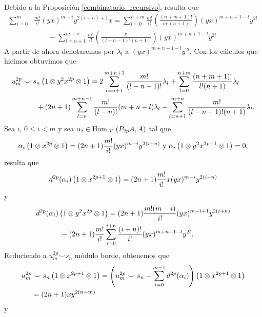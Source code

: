 \documentclass[fleqn,../tesis.tex]{subfiles}
\begin{document}
Debido a la Proposición \ref{combinatorio_recursivo}, resulta que
\begin{align*}
	\sum_{i = 0}^{m} & \frac{m!}{i!}(yx)^{m - i}y^{2(i + n) + 1}x
		= \sum_{l = 0}^{n + m}\frac{m!}{l!}\left(\frac{(n + m + 1)!}{m!(n + 1)}\right)(yx)^{m + n + 1 - l}y^{2l}\\
	&\qquad -\sum_{l = n + 1}^{m + n}\frac{m!}{l!}\left(\frac{l!}{(l - n - 1)!(n + 1)}\right)(yx)^{m + n + 1 - l}y^{2l}
\end{align*}
A partir de ahora denotaremos por $\lambda_l$ a $(yx)^{m + n + 1 - l}y^{2l}$. Con los cálculos que hicimos obtuvimos que
\begin{align*}
	u_m^{2p}& \smile s_n\left(1 \otimes y^2x^{2p} \otimes 1\right) =
		2\sum_{l = n + 1}^{m + n + 1}\frac{m!}{(l - n - 1)!}\lambda_l
		+\sum_{l = 0}^{n + m}\frac{(n + m + 1)!}{l!(n + 1)}\lambda_l\\
	&\qquad+ (2n + 1)\sum_{l = n}^{m + n - 1}\frac{m!}{(l - n)!}(m + n - l)\lambda_l
		-\sum_{l = n + 1}^{m + n}\frac{m!}{(l - n - 1)!(n + 1)}\lambda_l.
\end{align*}
Sea $i$, $0 \leq i < m$ y sea $\alpha_i \in \operatorname{Hom}_{A^e}\left(P_{2p}A, A\right)$ tal que
\[
	\alpha_i\left(1\otimes x^{2p} \otimes 1\right) = (2n + 1)\frac{m!}{i!}(yx)^{m - i}y^{2(i + n)}
	\text{ y } \alpha_i\left(1\otimes y^2x^{2p - 1} \otimes 1\right) = 0,
\]
resulta que
\begin{align*}
	d^{2p}(\alpha_i)\left(1 \otimes x^{2p + 1}\otimes 1\right) = (2n + 1)\frac{m!}{i!}x(yx)^{m - i}y^{2(i + n)}
\end{align*}
y
\begin{align*}
	d^{2p}&(\alpha_i)\left(1 \otimes y^2x^{2p}\otimes 1\right) =
		(2n + 1)\frac{m!(m  - i)}{i!}(yx)^{m - i + 1}y^{2(i + n)}\\
	&\qquad- (2n + 1)\frac{m!}{i!}\sum_{i = 0}^{i + n}\frac{(i + n)!}{i!}(yx)^{m + n + 1 - l}y^{2l}.
\end{align*}
Reduciendo a $u_m^{2p} \smile s_n$ módulo borde, obtenemos que
\begin{align*}
	u_m^{2p}& \smile s_n\left(1 \otimes x^{2p + 1} \otimes 1\right) = 
		\left(u_m^{2p} \smile s_n - \sum_{i =0}^{m - 1}d^{2p}(\alpha_i)\right)
		\left(1 \otimes x^{2p + 1} \otimes 1\right)\\ &= (2n + 1)xy^{2(n + m)}
\end{align*}
y
\end{document}
